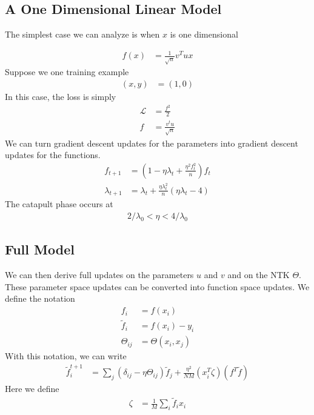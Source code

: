\documentclass[book.tex]{subfiles}
\begin{document}

\subsection{A One Dimensional Linear Model}

The simplest case we can analyze is when $x$ is one dimensional 

\begin{align}
f(x) &= \frac{1}{\sqrt{n}}v^T u x
\end{align}
Suppose we one training example
\begin{align}
    (x, y) &= (1, 0)
\end{align}
In this case, the loss is simply
\begin{align}
    \mathcal{L} &= \frac{f^2}{2} \\
    f &= \frac{v^tu}{\sqrt{n}}
\end{align}
We can turn gradient descent updates for the parameters into gradient descent updates for the functions.
\begin{align}
    f_{t+1} &= (1 - \eta \lambda_t + \frac{\eta^2 f_t^2}{n} ) f_t \\
    \lambda_{t+1} &= \lambda_t + \frac{\eta \lambda_t^2}{n}(\eta \lambda_t -4) 
\end{align}
The catapult phase occurs at 
\begin{align}
    2/\lambda_0 < \eta < 4/\lambda_0
\end{align}

\subsection{Full Model}
We can then derive full updates on the parameters $u$ and $v$ and on the NTK $\Theta$. These parameter space updates can be converted into function space updates. We define the notation
\begin{align}
    f_i &= f(x_i) \\
    \tilde{f}_i &= f(x_i) - y_i \\
    \Theta_{ij} &= \Theta(x_i, x_j)
\end{align}
With this notation, we can write
\begin{align}
    \tilde{f}_{i}^{t+1} &= \sum_j (\delta_{i j} - \eta \Theta_{i j}) \tilde{f}_j + \frac{\eta^2}{NM} (x^T_i \zeta)(f^T\tilde{f})
\end{align}
Here we define
\begin{align}
    \zeta &= \frac{1}{M} \sum_i \tilde{f}_i x_i
\end{align}
\end{document}
